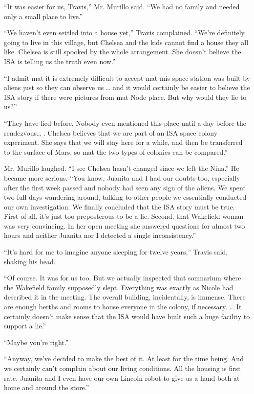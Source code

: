 \documentclass[]{article}
\begin{document}
{“It was easier for us, Travis,” Mr. Murillo said. “We had no family and needed only a small place to live.”

“We haven’t even settled into a house yet,” Travis complained. “We’re definitely going to live in this village, but Chelsea and the kids cannot find a house they all like. Chelsea is still spooked by the whole arrangement. She doesn’t believe the ISA is telling us the truth even now.”

“I admit mat it is extremely difficult to accept mat mis space station was built by aliens just so they can observe us … and it would certainly be easier to believe the ISA story if there were pictures from mat Node place. But why would they lie to us?”

“They have lied before. Nobody even mentioned this place until a day before the rendezvous… . Chelsea believes that we are part of an ISA space colony experiment. She says that we will stay here for a while, and then be transferred to the surface of Mars, so mat the two types of colonies can be compared.”

Mr. Murillo laughed. “I see Chelsea hasn’t changed since we left the Nina.” He became more serious. “You know, Juanita and I had our doubts too, especially after the first week passed and nobody had seen any sign of the aliens. We spent two full days wandering around, talking to other people-we essentially conducted our own investigation. We finally concluded that the ISA story must be true. First of all, it’s just too preposterous to be a lie. Second, that Wakefield woman was very convincing. In her open meeting she answered questions for almost two hours and neither Juanita nor I detected a single inconsistency.”

“It’s hard for me to imagine anyone sleeping for twelve years,” Travis said, shaking his head.

“Of course. It was for us too. But we actually inspected that somnarium where the Wakefield family supposedly slept. Everything was exactly as Nicole had described it in the meeting. The overall building, incidentally, is immense. There are enough berths and rooms to house everyone in the colony, if necessary. … It certainly doesn’t make sense that the ISA would have built such a huge facility to support a lie.”

“Maybe you’re right.”

“Anyway, we’ve decided to make the best of it. At least for the time being. And we certainly can’t complain about our living conditions. All the housing is first rate. Juanita and I even have our own Lincoln robot to give us a hand both at home and around the store.”

}
\end{document}
